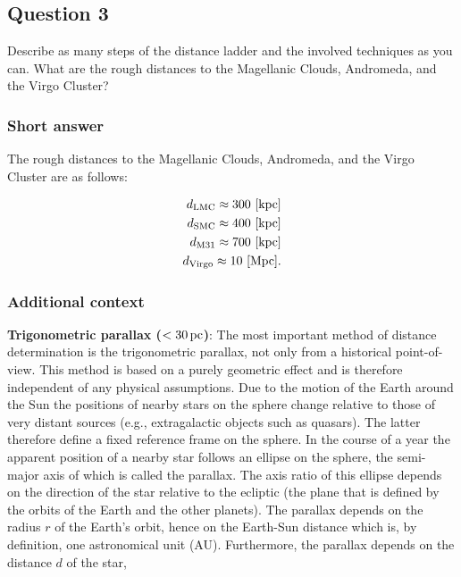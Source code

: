 \documentclass[a4paper,11pt]{article}
\begin{document}
\newpage
\subsection{Question 3}

Describe as many steps of the distance ladder and the involved techniques as you can. What are the rough distances to the Magellanic Clouds, Andromeda, and the Virgo Cluster?

\subsubsection{Short answer}

The rough distances to the Magellanic Clouds, Andromeda, and the Virgo Cluster are as follows:

\begin{align*}
    d_\mathrm{LMC} \approx 300 ~ [{\rm kpc}] \\
    d_\mathrm{SMC} \approx 400 ~ [{\rm kpc}] \\
    d_\mathrm{M31} \approx 700 ~ [{\rm kpc}] \\
    d_\mathrm{Virgo} \approx 10 ~ [{\rm Mpc}].
\end{align*}

\subsubsection{Additional context}

{\noindent}\textbf{Trigonometric parallax ($<30\,{\rm pc}$)}: The most important method of distance determination is the trigonometric parallax, not only from a historical point-of-view. This method is based on a purely geometric effect and is therefore independent of any physical assumptions. Due to the motion of the Earth around the Sun the positions of nearby stars on the sphere change relative to those of very distant sources (e.g., extragalactic objects such as quasars). The latter therefore define a fixed reference frame on the sphere. In the course of a year the apparent position of a nearby star follows an ellipse on the sphere, the semi-major axis of which is called the parallax. The axis ratio of this ellipse depends on the direction of the star relative to the ecliptic (the plane that is defined by the orbits of the Earth and the other planets). The parallax depends on the radius $r$ of the Earth’s orbit, hence on the Earth-Sun distance which is, by definition, one astronomical unit (AU). Furthermore, the parallax depends on the distance $d$ of the star,
\end{document}
